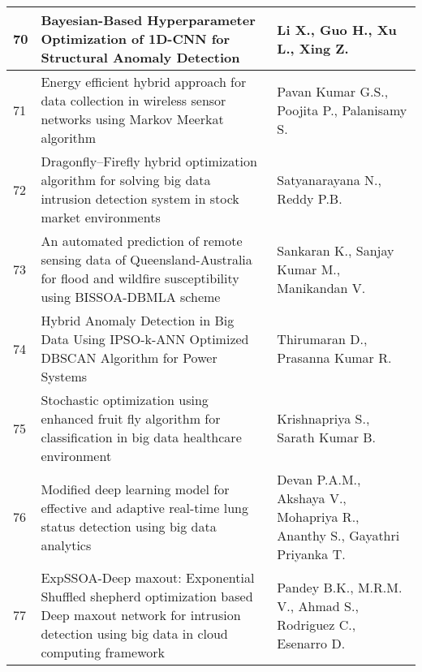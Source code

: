 \begin{landscape}
\begin{longtable}{|p{0.5cm}|p{9cm}|p{7cm}|}
    \hline
    70 & Bayesian-Based Hyperparameter Optimization of 1D-CNN for Structural Anomaly Detection & Li X., Guo H., Xu L., Xing Z. \\
    \hline
    71 & Energy efficient hybrid approach for data collection in wireless sensor networks using Markov Meerkat algorithm & Pavan Kumar G.S., Poojita P., Palanisamy S. \\
    \hline
    72 & Dragonfly–Firefly hybrid optimization algorithm for solving big data intrusion detection system in stock market environments & Satyanarayana N., Reddy P.B. \\
    \hline
    73 & An automated prediction of remote sensing data of Queensland-Australia for flood and wildfire susceptibility using BISSOA-DBMLA scheme & Sankaran K., Sanjay Kumar M., Manikandan V. \\
    \hline
    74 & Hybrid Anomaly Detection in Big Data Using IPSO-k-ANN Optimized DBSCAN Algorithm for Power Systems & Thirumaran D., Prasanna Kumar R. \\
    \hline
    75 & Stochastic optimization using enhanced fruit fly algorithm for classification in big data healthcare environment & Krishnapriya S., Sarath Kumar B. \\
    \hline
    76 & Modified deep learning model for effective and adaptive real-time lung status detection using big data analytics & Devan P.A.M., Akshaya V., Mohapriya R., Ananthy S., Gayathri Priyanka T. \\
    \hline
    77 & ExpSSOA-Deep maxout: Exponential Shuffled shepherd optimization based Deep maxout network for intrusion detection using big data in cloud computing framework & Pandey B.K., M.R.M. V., Ahmad S., Rodriguez C., Esenarro D. \\
    \hline

    \end{longtable}
    \end{landscape}
